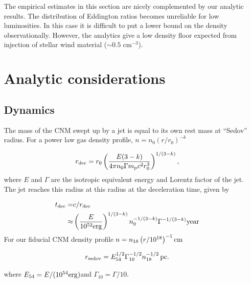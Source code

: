 \documentclass[usenatbib,fleqn]{mnras}
\begin{document}
The empirical estimates in this section are nicely complemented by our
analytic results. The distribution of Eddington ratios becomes
unreliable for low luminosities.  In this case it is difficult to put
a lower bound on the density observationally. However, the analytics
give a low density floor expected from injection of stellar wind
material ($\sim 0.5$ cm$^{-3}$).




\section{Analytic considerations}
\label{sec:jet}

\subsection{Dynamics}
\label{sec:analytic}

The mass of the CNM swept up by a jet is equal to its own rest mass at
``Sedov'' radius. For a power law gas density profile, $n= n_0 \left(r/r_0\right)^{-k}$

\begin{equation}
  r_{\rm dec} = r_0 \left( \frac{E(3-k)}{4\pi n_{0}
      \Gamma m_{\rm p} c^2 r_0^3} \right)^{1/(3-k)}, 
  \label{eq:rdec}
\end{equation}
%
where $E$ and $\Gamma$ are the isotropic equivalent energy and Lorentz
factor of the jet. The jet reaches this radius at this radius at the
deceleration time, given by

\begin{align}
 t_{\rm dec}= &c/r_{\rm dec} \nonumber\\
 \approx & \left(\frac{E}{10^{52} {\rm erg}}\right)^{1/(3-k)}
 n_0^{-1/(3-k)} \Gamma^{-1/(3-k)}{\rm year}
 \label{eq:tdec}
\end{align}
%
For our fiducial CNM density profile $n=n_{18}\left(r/10^{18}\right)^{-1} {\rm cm}$


\begin{equation}
r_{\rm sedov} = E_{54}^{1/2} \Gamma_{10}^{-1/2} n_{\rm 18}^{-1/2}\,{\rm pc}. 
\end{equation}

\noindent where $E_{54}=E/(10^{54} {\rm erg})$and $\Gamma_{10}=\Gamma/10$.
\end{document}
